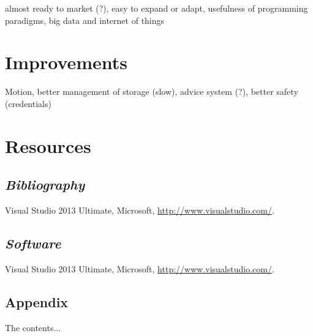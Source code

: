\documentclass[12pt]{article}
\begin{document}
almost ready to market (?), easy to expand or adapt, usefulness of programming paradigms, big data and internet of things

\newpage
\section{Improvements}

Motion, better management of storage (slow), advice system (?), better safety (credentials)
\newpage
\section{Resources}
\subsection{\it{Bibliography}}
\begin{description}
\item Visual Studio 2013 Ultimate, Microsoft, \url{http://www.visualstudio.com/}.
\end{description}
\subsection{\it{Software}}
\begin{description}
\item Visual Studio 2013 Ultimate, Microsoft, \url{http://www.visualstudio.com/}.
\end{description}

\newpage

\begin{appendices}
\section{Appendix}
The contents...
\end{appendices}
\end{document}
